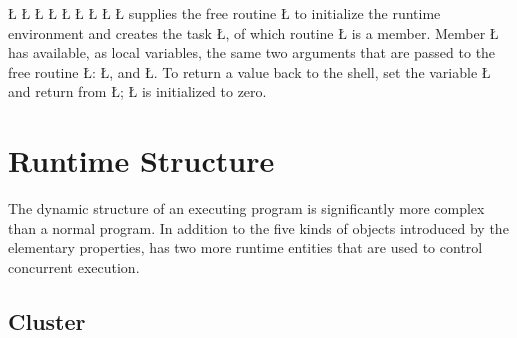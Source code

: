 \documentclass[openright,twoside]{report}
\begin{document}
\L{}
\CE{}\L{}
\CE{}\L{\LB{}}
\L{\LB{}}
\CE{}\L{\LB{}}
\L{\LB{}}
\CE{}\L{\LB{}}
\L{\LB{}}
\CE{}\L{\LB{\}}}
\endlgrinde\LGend
\uC supplies the free routine \LGinlinetrue\LGbegin\lgrinde\L{}\endlgrinde\LGend{} to initialize the \uC runtime environment and creates the task \LGinlinetrue\LGbegin\lgrinde\L{}\endlgrinde\LGend{}, of which routine \LGinlinetrue\LGbegin\lgrinde\L{}\endlgrinde\LGend{} is a member.
Member \LGinlinetrue\LGbegin\lgrinde\L{}\endlgrinde\LGend{} has available, as local variables, the same two arguments that are passed to the free routine \LGinlinetrue\LGbegin\lgrinde\L{}\endlgrinde\LGend{}: \LGinlinetrue\LGbegin\lgrinde\L{}\endlgrinde\LGend{}, and \LGinlinetrue\LGbegin\lgrinde\L{}\endlgrinde\LGend{}.
To return a value back to the shell, set the variable \LGinlinetrue\LGbegin\lgrinde\L{}\endlgrinde\LGend{} and return from \LGinlinetrue\LGbegin\lgrinde\L{}\endlgrinde\LGend{};
\LGinlinetrue\LGbegin\lgrinde\L{}\endlgrinde\LGend{} is initialized to zero.


\section{\texorpdfstring{\uC Runtime Structure}{uC++ Runtime Structure}}

The dynamic structure of an executing \uC program is significantly more complex than a normal \CC program.
In addition to the five kinds of objects introduced by the elementary properties, \uC has two more runtime entities that are used to control concurrent execution.


\subsection{Cluster}
\label{s:RuntimeStructureCluster}
\end{document}
